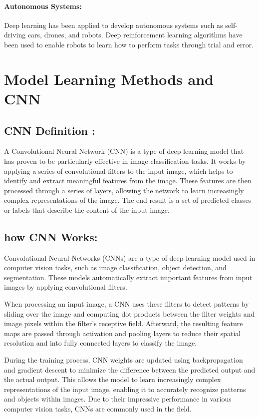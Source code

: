 			\paragraph{Autonomous Systems:}
				Deep learning has been applied to develop autonomous systems such as self-driving cars, drones, and robots. Deep reinforcement learning algorithms have been used to enable robots to learn how to perform tasks through trial and error. 	\cite{mnih2015human}
				
\section{Model Learning Methods and CNN}
		\subsection{CNN Definition :}
		A Convolutional Neural Network (CNN) is a type of deep learning model that has proven to be particularly effective in image classification tasks. It works by applying a series of convolutional filters to the input image, which helps to identify and extract meaningful features from the image. These features are then processed through a series of layers, allowing the network to learn increasingly complex representations of the image. The end result is a set of predicted classes or labels that describe the content of the input image. \cite{lecun2015deep}
		
		
		\subsection{how CNN Works:}
		Convolutional Neural Networks (CNNs) are a type of deep learning model used in computer vision tasks, such as image classification, object detection, and segmentation. These models automatically extract important features from input images by applying convolutional filters.
		
		When processing an input image, a CNN uses these filters to detect patterns by sliding over the image and computing dot products between the filter weights and image pixels within the filter's receptive field. Afterward, the resulting feature maps are passed through activation and pooling layers to reduce their spatial resolution and into fully connected layers to classify the image.
		
		During the training process, CNN weights are updated using backpropagation and gradient descent to minimize the difference between the predicted output and the actual output. This allows the model to learn increasingly complex representations of the input image, enabling it to accurately recognize patterns and objects within images. Due to their impressive performance in various computer vision tasks, CNNs are commonly used in the field.
		

